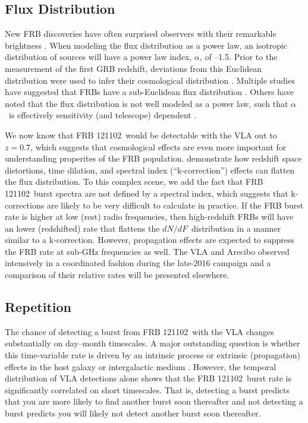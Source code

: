 \documentclass[twocolumn]{aastex61}
\newcommand{\frb}{FRB 121102}
\begin{document}
\subsection{Flux Distribution}

New FRB discoveries have often surprised observers with their remarkable brightness \citep{2007Sci...318..777L, 2016arXiv161105758R}. When modeling the flux distribution as a power law, an isotropic distribution of sources will have a power law index, $\alpha$, of --1.5. Prior to the measurement of the first GRB redshift, deviations from this Euclidean distribution were used to infer their cosmological distribution \citep[e.g., the $V/V_{\rm{max}}$\ test;][]{1992ApJ...388L..45M, 1995ApJ...453...25F}. Multiple studies have suggested that FRBs have a sub-Euclidean flux distribution \citep[$-0.5<\alpha<-0.9$;][]{2016ApJ...830...75V, 2016arXiv160206099L, 2016arXiv161100458L}. Others have noted that the flux distribution is not well modeled as a power law, such that $\alpha$\ is effectively sensitivity (and telescope) dependent \citep{2016MNRAS.461..984O, 2017arXiv170208040C}.

We now know that \frb\ would be detectable with the VLA out to $z=0.7$, which suggests that cosmological effects are even more important for understanding properites of the FRB population. \citet{2017arXiv170208040C} demonstrate how redshift space distortions, time dilation, and spectral index (``k-correction'') effects can flatten the flux distribution. To this complex scene, we add the fact that \frb\ burst spectra are not defined by a spectral index, which suggests that k-corrections are likely to be very difficult to calculate in practice. If the FRB burst rate is higher at low (rest) radio frequencies, then high-redshift FRBs will have an lower (redshifted) rate that flattens the $dN/dF$\ distribution in a manner similar to a k-correction. However, propagation effects are expected to suppress the FRB rate at sub-GHz frequencies \citep{2017MNRAS.465.2286R, 2017arXiv170107457C} as well. The VLA and Arecibo observed intensively in a coordinated fashion during the late-2016 campaign and a comparison of their relative rates will be presented elsewhere. 

\subsection{Repetition}

The chance of detecting a burst from \frb\ with the VLA changes substantially on day--month timescales. A major outstanding question is whether this time-variable rate is driven by an intrinsic process \citep{2016ApJ...826..226K} or extrinsic (propagation) effects in the host galaxy or intergalactic medium \citep{2017arXiv170306580C}. However, the temporal distribution of VLA detections alone shows that the \frb\ burst rate is significantly correlated on short timescales. That is, detecting a burst predicts that you are more likely to find another burst soon thereafter and not detecting a burst predicts you will likely not detect another burst soon thereafter. 
\end{document}
